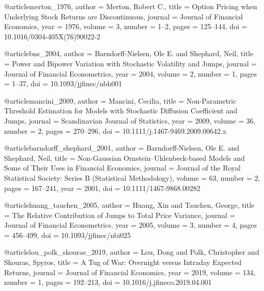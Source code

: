 @article{merton_1976,
  author  = {Merton, Robert C.},
  title   = {Option Pricing when Underlying Stock Returns are Discontinuous},
  journal = {Journal of Financial Economics},
  year    = {1976}, volume = {3}, number = {1--2}, pages = {125--144},
  doi     = {10.1016/0304-405X(76)90022-2}
}


@article{bns_2004,
  author  = {Barndorff-Nielsen, Ole E. and Shephard, Neil},
  title   = {Power and Bipower Variation with Stochastic Volatility and Jumps},
  journal = {Journal of Financial Econometrics},
  year    = {2004}, volume = {2}, number = {1}, pages = {1--37},
  doi     = {10.1093/jjfinec/nbh001}
}


@article{mancini_2009,
  author  = {Mancini, Cecilia},
  title   = {Non-Parametric Threshold Estimation for Models with Stochastic Diffusion Coefficient and Jumps},
  journal = {Scandinavian Journal of Statistics},
  year    = {2009}, volume = {36}, number = {2}, pages = {270--296},
  doi     = {10.1111/j.1467-9469.2009.00642.x}
}

@article{barndorff_shephard_2001,
  author  = {Barndorff-Nielsen, Ole E. and Shephard, Neil},
  title   = {Non-{G}aussian {O}rnstein--{U}hlenbeck-based Models and Some of Their Uses in Financial Economics},
  journal = {Journal of the Royal Statistical Society: Series B (Statistical Methodology)},
  volume  = {63}, number = {2}, pages = {167--241}, year = {2001},
  doi     = {10.1111/1467-9868.00282}
}


@article{huang_tauchen_2005,
  author  = {Huang, Xin and Tauchen, George},
  title   = {The Relative Contribution of Jumps to Total Price Variance},
  journal = {Journal of Financial Econometrics},
  year    = {2005}, volume = {3}, number = {4}, pages = {456--499},
  doi     = {10.1093/jjfinec/nbi025}
}


@article{lou_polk_skouras_2019,
  author  = {Lou, Dong and Polk, Christopher and Skouras, Spyros},
  title   = {A Tug of War: Overnight versus Intraday Expected Returns},
  journal = {Journal of Financial Economics},
  year    = {2019}, volume = {134}, number = {1}, pages = {192--213},
  doi     = {10.1016/j.jfineco.2019.04.001}
}


